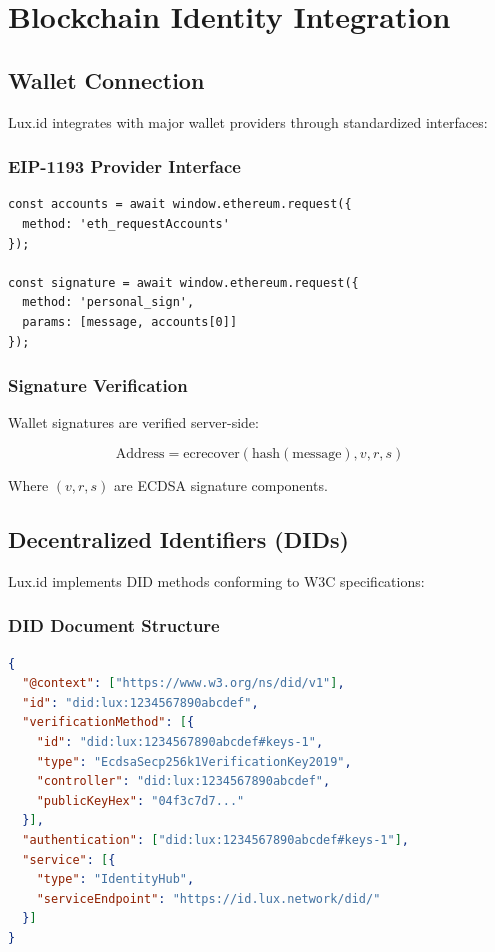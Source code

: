 \section{Blockchain Identity Integration}


\subsection{Wallet Connection}

Lux.id integrates with major wallet providers through standardized interfaces:

\subsubsection{EIP-1193 Provider Interface}

\begin{lstlisting}[language=Solidity]
const accounts = await window.ethereum.request({
  method: 'eth_requestAccounts'
});

const signature = await window.ethereum.request({
  method: 'personal_sign',
  params: [message, accounts[0]]
});
\end{lstlisting}

\subsubsection{Signature Verification}

Wallet signatures are verified server-side:

\begin{equation}
    \text{Address} = \text{ecrecover}(\text{hash}(\text{message}), v, r, s)
\end{equation}

Where $(v, r, s)$ are ECDSA signature components.

\subsection{Decentralized Identifiers (DIDs)}

Lux.id implements DID methods conforming to W3C specifications:

\subsubsection{DID Document Structure}

\begin{lstlisting}[language=json]
{
  "@context": ["https://www.w3.org/ns/did/v1"],
  "id": "did:lux:1234567890abcdef",
  "verificationMethod": [{
    "id": "did:lux:1234567890abcdef#keys-1",
    "type": "EcdsaSecp256k1VerificationKey2019",
    "controller": "did:lux:1234567890abcdef",
    "publicKeyHex": "04f3c7d7..."
  }],
  "authentication": ["did:lux:1234567890abcdef#keys-1"],
  "service": [{
    "type": "IdentityHub",
    "serviceEndpoint": "https://id.lux.network/did/"
  }]
}
\end{lstlisting}

